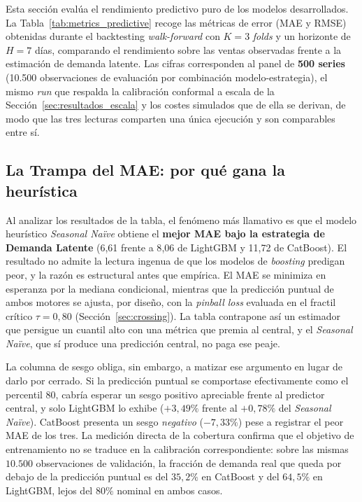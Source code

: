 Esta sección evalúa el rendimiento predictivo puro de los modelos desarrollados. La Tabla~\ref{tab:metrics_predictive} recoge las métricas de error (MAE y RMSE) obtenidas durante el backtesting \textit{walk-forward} con $K=3$ \textit{folds} y un horizonte de $H=7$ días, comparando el rendimiento sobre las ventas observadas frente a la estimación de demanda latente. Las cifras corresponden al panel de \textbf{500 series} (10.500 observaciones de evaluación por combinación modelo-estrategia), el mismo \textit{run} que respalda la calibración conformal a escala de la Sección~\ref{sec:resultados_escala} y los costes simulados que de ella se derivan, de modo que las tres lecturas comparten una única ejecución y son comparables entre sí.



\subsection{La Trampa del MAE: por qué gana la heurística}
\label{sec:trampa_mae}

Al analizar los resultados de la tabla, el fenómeno más llamativo es que el modelo heurístico \textit{Seasonal Naïve} obtiene el \textbf{mejor MAE bajo la estrategia de Demanda Latente} (6{,}61 frente a 8{,}06 de LightGBM y 11{,}72 de CatBoost). El resultado no admite la lectura ingenua de que los modelos de \textit{boosting} predigan peor, y la razón es estructural antes que empírica. El MAE se minimiza en esperanza por la mediana condicional, mientras que la predicción puntual de ambos motores se ajusta, por diseño, con la \textit{pinball loss} evaluada en el fractil crítico $\tau = 0{,}80$ (Sección~\ref{sec:crossing}). La tabla contrapone así un estimador que persigue un cuantil alto con una métrica que premia al central, y el \textit{Seasonal Naïve}, que sí produce una predicción central, no paga ese peaje.

La columna de sesgo obliga, sin embargo, a matizar ese argumento en lugar de darlo por cerrado. Si la predicción puntual se comportase efectivamente como el percentil 80, cabría esperar un sesgo positivo apreciable frente al predictor central, y solo LightGBM lo exhibe ($+3{,}49\%$ frente al $+0{,}78\%$ del \textit{Seasonal Naïve}). CatBoost presenta un sesgo \emph{negativo} ($-7{,}33\%$) pese a registrar el peor MAE de los tres. La medición directa de la cobertura confirma que el objetivo de entrenamiento no se traduce en la calibración correspondiente: sobre las mismas $10.500$ observaciones de validación, la fracción de demanda real que queda por debajo de la predicción puntual es del $35{,}2\%$ en CatBoost y del $64{,}5\%$ en LightGBM, lejos del $80\%$ nominal en ambos casos.

